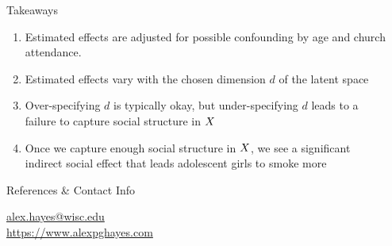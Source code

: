 \documentclass[final]{beamer}
\newlength{\sepwidth}
\newlength{\colwidth}
\newcommand{\separatorcolumn}{\begin{column}{\sepwidth}\end{column}}
\begin{document}
\begin{frame}[t]
\begin{columns}[t]
\begin{column}{\colwidth}
            \begin{alertblock}{Takeaways}
                \begin{enumerate}
                    \item Estimated effects are adjusted for possible confounding by age and church attendance.
                    \item Estimated effects vary with the chosen dimension $d$ of the latent space
                    \item Over-specifying $d$ is typically okay, but under-specifying $d$ leads to a failure to capture social structure in $X$
                    \item Once we capture enough social structure in $X$, we see a significant indirect social effect that leads adolescent girls to smoke more
                \end{enumerate}
            \end{alertblock}


            \begin{block}{References \& Contact Info}

                \nocite{hayes2024c}
                \printbibliography

                \begin{center}
                    \url{alex.hayes@wisc.edu} \\
                    \url{https://www.alexpghayes.com}
                \end{center}
            \end{block}


        \end{column}

        \separatorcolumn
    \end{columns}
\end{frame}
\end{document}
